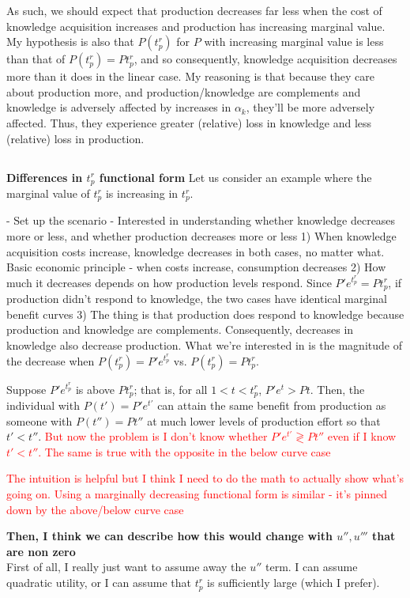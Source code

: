 \documentclass[source/paper/main.tex]{subfiles}
\begin{document}
As such, we should expect that production decreases far less when the cost of knowledge acquisition increases and production has increasing marginal value. My hypothesis is also that $P(t_p^r)$ for $P$ with increasing marginal value is less than that of $P(t_p^r) = P t_p^r$, and so consequently, knowledge acquisition decreases more than it does in the linear case. My reasoning is that because they care about production more, and production/knowledge are complements and knowledge is adversely affected by increases in $\alpha_k$, they'll be more adversely affected. Thus, they experience greater (relative) loss in knowledge and less (relative) loss in production. 
\subsection{}
\textbf{Differences in $t_p^r$ functional form}
Let us consider an example where the marginal value of $t_p^r$ is increasing in $t_p^r$. 

- Set up the scenario
- Interested in understanding whether knowledge decreases more or less, and whether production decreases more or less
1) When knowledge acquisition costs increase, knowledge decreases in both cases, no matter what. Basic economic principle - when costs increase, consumption decreases
2) How much it decreases depends on how production levels respond. Since $P' e^{t_p^r} = P t_p^r$, if production didn't respond to knowledge, the two cases have identical marginal benefit curves
3) The thing is that production does respond to knowledge because production and knowledge are complements. Consequently, decreases in knowledge also decrease production. What we're interested in is the magnitude of the decrease when $P(t_p^r) = P' e^{t_p^r}$ vs. $P(t_p^r) = P t_p^r$. 

Suppose $P' e^{t_p^r}$ is above $P t_p^r$; that is, for all $1<t < t_p^r$, $P' e^t > Pt$. Then, the individual with $P(t') = P' e^{t'}$ can attain the same benefit from production as someone with $P(t'') = P t''$ at much lower levels of production effort so that $t' < t''$. \textcolor{red}{But now the problem is I don't know whether $P' e^{t'} \gtrless P t''$ even if I know $t' < t''$. The same is true with the opposite in the below curve case}

\textcolor{red}{The intuition is helpful but I think I need to do the math to actually show what's going on. Using a marginally decreasing functional form is similar - it's pinned down by the above/below curve case}




\textbf{Then, I think we can describe how this would change with $u'', u'''$ that are non zero}\\
First of all, I really just want to assume away the $u''$ term. I can assume quadratic utility, or I can assume that $t_p^r$ is sufficiently large (which I prefer). 
\end{document}
